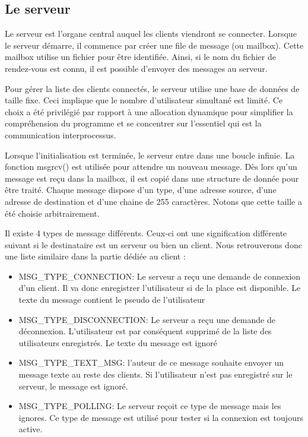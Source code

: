 \documentclass{article}
\begin{document}
	\subsection{Le serveur}
	\par Le serveur est l'organe central auquel les clients viendront se connecter. Lorsque le serveur démarre, il commence par créer une file de message (ou mailbox). Cette mailbox utilise un fichier pour être identifiée. Ainsi, si le nom du fichier de rendez-vous est connu, il est possible d'envoyer des messages au serveur.
	\par Pour gérer la liste des clients connectés, le serveur utilise une base de données de taille fixe. Ceci implique que le nombre d'utilisateur simultané est limité. Ce choix a été privilégié par rapport à une allocation dynamique pour simplifier la compréhension du programme et se concentrer sur l'essentiel qui est la communication interprocessus.
	\par Lorsque l'initialisation est terminée, le serveur entre dans une boucle infinie. La fonction msgrcv() est utilisée pour attendre un nouveau message. Dès lors qu'un message est reçu dans la mailbox, il est copié dans une structure de donnée pour être traité. Chaque message dispose d'un type, d'une adresse source, d'une adresse de destination et d'une chaine de 255 caractères. Notons que cette taille a été choisie arbitrairement.
	\par Il existe 4 types de message différents. Ceux-ci ont une signification différente suivant si le destinataire est un serveur ou bien un client. Nous retrouverons donc une liste similaire dans la partie dédiée au client :
	\begin{itemize}\renewcommand{\labelitemi}{$\bullet$} 
		\item MSG\_TYPE\_CONNECTION: Le serveur a reçu une demande de connexion d'un client. Il va donc enregistrer l'utilisateur si de la place est disponible. Le texte du message contient le pseudo de l'utilisateur
		\item MSG\_TYPE\_DISCONNECTION: Le serveur a reçu une demande de déconnexion. L'utilisateur est par conséquent supprimé de la liste des utilisateurs enregistrés. Le texte du message est ignoré
		\item MSG\_TYPE\_TEXT\_MSG: l'auteur de ce message souhaite envoyer un message texte au reste des clients. Si l'utilisateur n'est pas enregistré sur le serveur, le message est ignoré.
		\item MSG\_TYPE\_POLLING: Le serveur reçoit ce type de message mais les ignores. Ce type de message est utilisé pour tester si la connexion est toujours active.
	\end{itemize}
\end{document}
